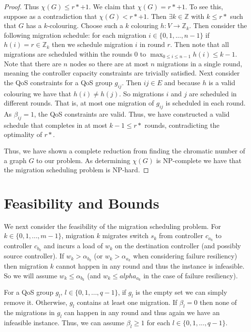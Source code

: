 \documentclass[letterpaper,12pt,titlepage,oneside,final]{article}
\begin{document}
\begin{proof}
    Thus $\chi(G) \leq r* + 1$. We claim that $\chi(G) = r* + 1$. To see this, suppose as a contradiction that $\chi(G) < r* + 1$. Then $\exists k \in \mathbb{Z}$ with $k \leq r*$ such that $G$ has a $k$-colouring. Choose such a $k$ colouring $h: V \rightarrow \mathbb{Z}_{k}$. Then consider the following migration schedule: for each migration $i \in \{0, 1, ..., n-1\}$ if $h(i) = r \in \mathbb{Z}_{k}$ then we schedule migration $i$ in round $r$. Then note that all migrations are scheduled within the rounds 0 to $\max_{0 \leq i \leq n-1} h(i) \leq k - 1$. Note that there are $n$ nodes so there are at most $n$ migrations in a single round, meaning the controller capacity constraints are trivially satisfied. Next consider the QoS constraints for a QoS group $g_{ij}$. Then $ij \in E$ and because $h$ is a valid colouring we have that $h(i) \neq h(j)$. So migrations $i$ and $j$ are scheduled in different rounds. That is, at most one migration of $g_{ij}$ is scheduled in each round. As $\beta_{ij} = 1$, the QoS constraints are valid. Thus, we have constructed a valid schedule that completes in at most $k - 1 \leq r*$ rounds, contradicting the optimality of $r*$.
    
    Thus, we have shown a complete reduction from finding the chromatic number of a graph $G$ to our problem. As determining $\chi(G)$ is NP-complete we have that the migration scheduling problem is NP-hard. 
\end{proof}

\section{Feasibility and Bounds}
\noindent We next consider the feasibility of the migration scheduling problem. For $k \in \{0, 1, ..., m-1\}$, migration $k$ migrates switch $s_{k}$ from controller $c_{a_{k}}$ to controller $c_{b_{k}}$ and incurs a load of $w_{k}$ on the destination controller (and possibly source controller). If $w_{k} > \alpha_{b_{k}}$ (or $w_{k} > \alpha_{a_{k}}$ when considering failure resiliency) then migration $k$ cannot happen in any round and thus the instance is infeasible. So we will assume $w_{k} \leq \alpha_{b_{k}}$ (and $w_{k} \leq alpha_{a_{k}}$ in the case of failure resiliency).

For a QoS group $g_{l}$, $l \in \{0, 1, ..., q - 1\}$, if $g_{l}$ is the empty set we can simply remove it. Otherwise, $g_{l}$ contains at least one migration. If $\beta_{l} = 0$ then none of the migrations in $g_{l}$ can happen in any round and thus again we have an infeasible instance. Thus, we can assume $\beta_{l} \geq 1$ for each $l \in \{0, 1, ..., q - 1\}$.
\end{document}
